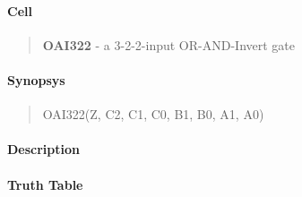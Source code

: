 \label{OAI322}
\paragraph{Cell}
\begin{quote}
    \textbf{OAI322} - a 3-2-2-input OR-AND-Invert gate
\end{quote}

\paragraph{Synopsys}
\begin{quote}
    OAI322(Z, C2, C1, C0, B1, B0, A1, A0)
\end{quote}

\paragraph{Description}



\paragraph{Truth Table}


